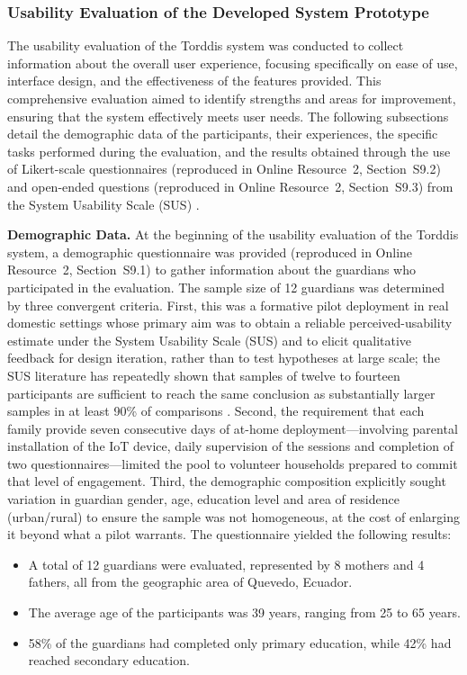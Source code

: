 \subsubsection{Usability Evaluation of the Developed System Prototype}
The usability evaluation of the Torddis system was conducted to collect information about the overall user experience, focusing specifically on ease of use, interface design, and the effectiveness of the features provided. This comprehensive evaluation aimed to identify strengths and areas for improvement, ensuring that the system effectively meets user needs. The following subsections detail the demographic data of the participants, their experiences, the specific tasks performed during the evaluation, and the results obtained through the use of Likert-scale questionnaires (reproduced in Online Resource~2, Section~S9.2) and open-ended questions (reproduced in Online Resource~2, Section~S9.3) from the System Usability Scale (SUS) \citep{Brooke1996SUS}.

\noindent\textbf{Demographic Data.}
At the beginning of the usability evaluation of the Torddis system, a demographic questionnaire was provided (reproduced in Online Resource~2, Section~S9.1) to gather information about the guardians who participated in the evaluation. The sample size of 12 guardians was determined by three convergent criteria. First, this was a formative pilot deployment in real domestic settings whose primary aim was to obtain a reliable perceived-usability estimate under the System Usability Scale (SUS) and to elicit qualitative feedback for design iteration, rather than to test hypotheses at large scale; the SUS literature has repeatedly shown that samples of twelve to fourteen participants are sufficient to reach the same conclusion as substantially larger samples in at least 90\% of comparisons \citep{Orfanou2015Perceived}. Second, the requirement that each family provide seven consecutive days of at-home deployment---involving parental installation of the IoT device, daily supervision of the sessions and completion of two questionnaires---limited the pool to volunteer households prepared to commit that level of engagement. Third, the demographic composition explicitly sought variation in guardian gender, age, education level and area of residence (urban/rural) to ensure the sample was not homogeneous, at the cost of enlarging it beyond what a pilot warrants. The questionnaire yielded the following results:

\begin{itemize} 
	\item A total of 12 guardians were evaluated, represented by 8 mothers and 4 fathers, all from the geographic area of Quevedo, Ecuador.
	\item The average age of the participants was 39 years, ranging from 25 to 65 years.
	\item 58\% of the guardians had completed only primary education, while 42\% had reached secondary education.
\end{itemize}

